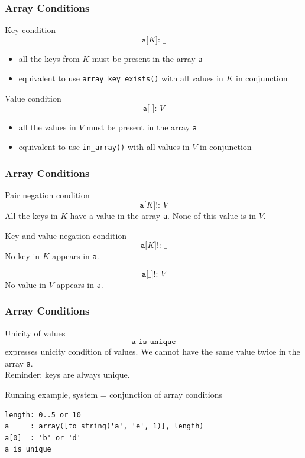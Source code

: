 \documentclass[9pt]{beamer}
\newcommand{\code}[1]{\texttt{#1}}
\begin{document}
\begin{frame}
\frametitle{Array Conditions}

\begin{block}{Key condition}
$$\code{a[$K$]:~\_}$$
\vspace{-1.5em}
\begin{itemize}
\item all the keys from $K$ must be present in the array \code{a}
\item equivalent to use \code{array\_key\_exists()} with all values in $K$ in
conjunction
\end{itemize}
\end{block}

\begin{block}{Value condition}
$$\code{a[\_]:~$V$}$$
\vspace{-1.5em}
\begin{itemize}
\item all the values in $V$ must be present in the array \code{a}
\item equivalent to use \code{in\_array()} with all values in $V$ in conjunction
\end{itemize}
\end{block}

\end{frame}

\begin{frame}
\frametitle{Array Conditions}

\begin{block}{Pair negation condition}
$$\code{a[$K$]!:~$V$}$$
All the keys in $K$ have a value in the array \code{a}. None of this value is in
$V$.
\end{block}

\begin{block}{Key and value negation condition}
$$\code{a[$K$]!:~\_}$$
No key in $K$ appears in \code{a}.

$$\code{a[\_]!:~$V$}$$
No value in $V$ appears in \code{a}.
\end{block}

\end{frame}

\begin{frame}[fragile]
\frametitle{Array Conditions}

\begin{block}{Unicity of values}
$$\code{a is unique}$$
expresses unicity condition of values. We cannot have the same value twice in
the array \code{a}. \\

{
\small
Reminder: keys are always unique.
}
\end{block}

\begin{exampleblock}{Running example, system = conjunction of array conditions}
\begin{verbatim}
length: 0..5 or 10
a     : array([to string('a', 'e', 1)], length)
a[0]  : 'b' or 'd'
a is unique
\end{verbatim}
\end{exampleblock}

\end{frame}
\end{document}
